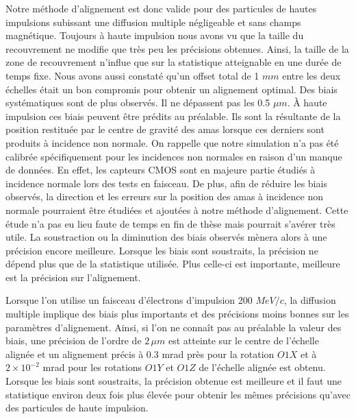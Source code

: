  \medskip
  
  Notre m\'ethode d'alignement est donc valide pour des particules de hautes impulsions subissant une diffusion multiple n\'egligeable et sans champs magn\'etique. Toujours \`a haute impulsion nous avons vu que la taille du recouvrement ne modifie que tr\`es peu les pr\'ecisions obtenues. Ainsi, la taille de la zone de recouvrement n'influe que sur la statistique atteignable en une dur\'ee de temps fixe. Nous avons aussi constat\'e qu'un offset total de 1 $mm$ entre les deux \'echelles était un bon compromis pour obtenir un alignement optimal. Des biais syst\'ematiques sont de plus observ\'es. Il ne d\'epassent pas les 0.5 $\mu m$. \`A haute impulsion ces biais peuvent \^etre pr\'edits au pr\'ealable. Ils sont la r\'esultante de la position restitu\'ee par le centre de gravit\'e des amas lorsque ces derniers sont produits \`a incidence non normale. On rappelle que notre simulation n'a pas \'et\'e calibr\'ee sp\'ecifiquement pour les incidences non normales en raison d'un manque de donn\'ees. En effet, les capteurs CMOS sont en majeure partie \'etudi\'es \`a incidence normale lors des tests en faisceau. De plus, afin de r\'eduire les biais observ\'es, la direction et les erreurs sur la position des amas \`a incidence non normale pourraient \^etre \'etudi\'ees et ajout\'ees \`a notre m\'ethode d'alignement. Cette \'etude n'a pas eu lieu faute de temps en fin de th\`ese mais pourrait s'av\'erer tr\`es utile. La soustraction ou la diminution des biais observ\'es m\`enera alors \`a une pr\'ecision encore meilleure. Lorsque les biais sont soustraits, la pr\'ecision ne d\'epend plus que de la statistique utilis\'ee. Plus celle-ci est importante, meilleure est la pr\'ecision sur l'alignement.
  
  \medskip
  
  Lorsque l'on utilise un faisceau d'\'electrons d'impulsion 200 $MeV/c$, la diffusion multiple implique des biais plus importants et des pr\'ecisions moins bonnes sur les param\`etres d'alignement. Ainsi, si l'on ne connaît pas au pr\'ealable la valeur des biais, une pr\'ecision de l'ordre de $2 \, \mu m$ est atteinte sur le centre de l'\'echelle align\'ee et un alignement pr\'ecis \`a $0.3$ mrad pr\`es pour la rotation $O1X$ et \`a $2 \times 10^{-2}$ mrad pour les rotations $O1Y$ et $O1Z$ de l'\'echelle align\'ee est obtenu. Lorsque les biais sont soustraits, la pr\'ecision obtenue est meilleure et il faut une statistique environ deux fois plus \'elev\'ee pour obtenir les m\^emes pr\'ecisions qu'avec des particules de haute impulsion.

